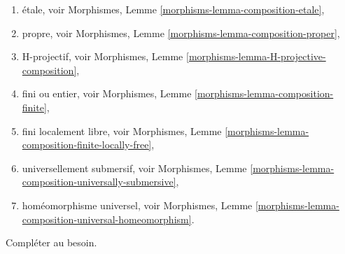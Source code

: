 \begin{remark}
\begin{enumerate}
Morphismes, Lemme \ref{morphisms-lemma-composition-unramified},
\item \'etale, voir
Morphismes, Lemme \ref{morphisms-lemma-composition-etale},
\item propre, voir
Morphismes, Lemme \ref{morphisms-lemma-composition-proper},
\item H-projectif, voir
Morphismes, Lemme \ref{morphisms-lemma-H-projective-composition},
\item fini ou entier, voir
Morphismes, Lemme \ref{morphisms-lemma-composition-finite},
\item fini localement libre, voir
Morphismes, Lemme \ref{morphisms-lemma-composition-finite-locally-free},
\item universellement submersif, voir
Morphismes, Lemme \ref{morphisms-lemma-composition-universally-submersive},
\item homéomorphisme universel, voir
Morphismes, Lemme \ref{morphisms-lemma-composition-universal-homeomorphism}.
\end{enumerate}
Compléter au besoin.
\end{remark}

